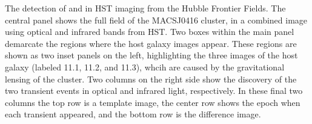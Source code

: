 \label{fig:SpockDetectionImages}
The detection of \spockone and \spocktwo in HST imaging from the
Hubble Frontier Fields. The central panel shows the full field of the
MACSJ0416 cluster, in a combined image using optical and infrared
bands from HST.  Two boxes within the main panel demarcate the regions
where the \spock host galaxy images appear. These regions are shown as
two inset panels on the left, highlighting the three images of the
host galaxy (labeled 11.1, 11.2, and 11.3), whcih are caused by the
gravitational lensing of the cluster.  Two columns on the right side
show the discovery of the two transient events in optical and infrared
light, respectively.  In these final two columns the top row is a
template image, the center row shows the epoch when each transient
appeared, and the bottom row is the difference image.
